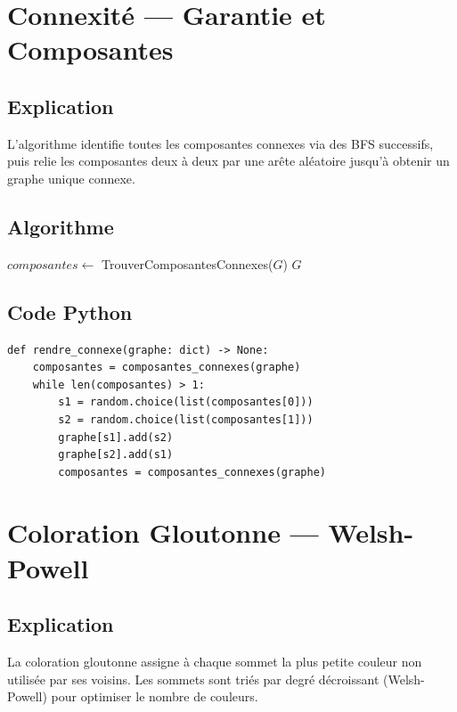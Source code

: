\documentclass[12pt, a4paper]{article}
\begin{document}
\section{Connexité — Garantie et Composantes}
\subsection{Explication}
\begin{tcolorbox}[explication]
    L'algorithme identifie toutes les composantes connexes via des BFS successifs, puis relie les composantes deux à deux par une arête aléatoire jusqu'à obtenir un graphe unique connexe.
\end{tcolorbox}

\subsection{Algorithme}
\begin{algorithm}[H]
    \caption{Garantie de connexité}
    $\mathit{composantes} \leftarrow$ TrouverComposantesConnexes($G$)\;
    \Retourner $G$\;
\end{algorithm}

\subsection{Code Python}
\begin{lstlisting}[style=python, caption={rendre\_connexe(graphe)}]
def rendre_connexe(graphe: dict) -> None:
    composantes = composantes_connexes(graphe)
    while len(composantes) > 1:
        s1 = random.choice(list(composantes[0]))
        s2 = random.choice(list(composantes[1]))
        graphe[s1].add(s2)
        graphe[s2].add(s1)
        composantes = composantes_connexes(graphe)
\end{lstlisting}

\section{Coloration Gloutonne — Welsh-Powell}
\subsection{Explication}
\begin{tcolorbox}[explication]
    La coloration gloutonne assigne à chaque sommet la plus petite couleur non utilisée par ses voisins. Les sommets sont triés par degré décroissant (Welsh-Powell) pour optimiser le nombre de couleurs.
\end{tcolorbox}
\end{document}
